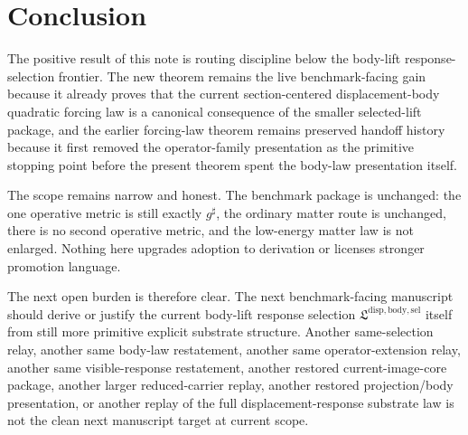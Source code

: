 \documentclass[11pt]{article}
\newcommand{\CompletedMetric}{g^{\sharp}}
\newcommand{\LiftSelectionPackage}{\mathfrak L^{\mathrm{disp,body,sel}}}
\begin{document}
\section{Conclusion}

The positive result of this note is routing discipline below the body-lift response-selection frontier. The new theorem remains the live benchmark-facing gain because it already proves that the current section-centered displacement-body quadratic forcing law is a canonical consequence of the smaller selected-lift package, and the earlier forcing-law theorem remains preserved handoff history because it first removed the operator-family presentation as the primitive stopping point before the present theorem spent the body-law presentation itself.

The scope remains narrow and honest. The benchmark package is unchanged: the one operative metric is still exactly \(\CompletedMetric\), the ordinary matter route is unchanged, there is no second operative metric, and the low-energy matter law is not enlarged. Nothing here upgrades adoption to derivation or licenses stronger promotion language.

The next open burden is therefore clear. The next benchmark-facing manuscript should derive or justify the current body-lift response selection \(\LiftSelectionPackage\) itself from still more primitive explicit substrate structure. Another same-selection relay, another same body-law restatement, another same operator-extension relay, another same visible-response restatement, another restored current-image-core package, another larger reduced-carrier replay, another restored projection/body presentation, or another replay of the full displacement-response substrate law is not the clean next manuscript target at current scope.
\end{document}

